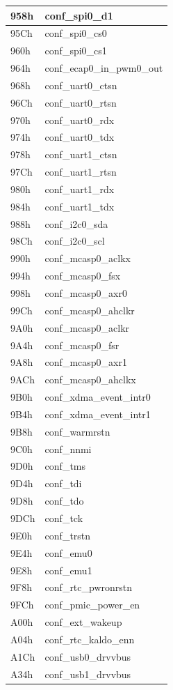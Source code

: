 \begin{longtable}{ | M{7.5cm} | M{7.5cm} |}
	958h & conf\_spi0\_d1 \\ \hline
	95Ch & conf\_spi0\_cs0 \\ \hline
	960h & conf\_spi0\_cs1 \\ \hline
	964h & conf\_ecap0\_in\_pwm0\_out \\ \hline
	968h & conf\_uart0\_ctsn \\ \hline
	96Ch & conf\_uart0\_rtsn \\ \hline
	970h & conf\_uart0\_rdx \\ \hline
	974h & conf\_uart0\_tdx \\ \hline
	978h & conf\_uart1\_ctsn \\ \hline
	97Ch & conf\_uart1\_rtsn \\ \hline
	980h & conf\_uart1\_rdx \\ \hline
	984h & conf\_uart1\_tdx \\ \hline
	988h & conf\_i2c0\_sda \\ \hline
	98Ch & conf\_i2c0\_scl \\ \hline
	990h & conf\_mcasp0\_aclkx \\ \hline
	994h & conf\_mcasp0\_fsx \\ \hline
	998h & conf\_mcasp0\_axr0 \\ \hline
	99Ch & conf\_mcasp0\_ahclkr \\ \hline
	9A0h & conf\_mcasp0\_aclkr \\ \hline
	9A4h & conf\_mcasp0\_fsr \\ \hline
	9A8h & conf\_mcasp0\_axr1 \\ \hline
	9ACh & conf\_mcasp0\_ahclkx \\ \hline
	9B0h & conf\_xdma\_event\_intr0 \\ \hline
	9B4h & conf\_xdma\_event\_intr1 \\ \hline
	9B8h & conf\_warmrstn \\ \hline
	9C0h & conf\_nnmi \\ \hline
	9D0h & conf\_tms \\ \hline
	9D4h & conf\_tdi \\ \hline
	9D8h & conf\_tdo \\ \hline
	9DCh & conf\_tck \\ \hline
	9E0h & conf\_trstn \\ \hline
	9E4h & conf\_emu0 \\ \hline
	9E8h & conf\_emu1 \\ \hline
	9F8h & conf\_rtc\_pwronrstn \\ \hline
	9FCh & conf\_pmic\_power\_en \\ \hline
	A00h & conf\_ext\_wakeup \\ \hline
	A04h & conf\_rtc\_kaldo\_enn \\ \hline
	A1Ch & conf\_usb0\_drvvbus \\ \hline
	A34h & conf\_usb1\_drvvbus \\ \hline
\end{longtable}

